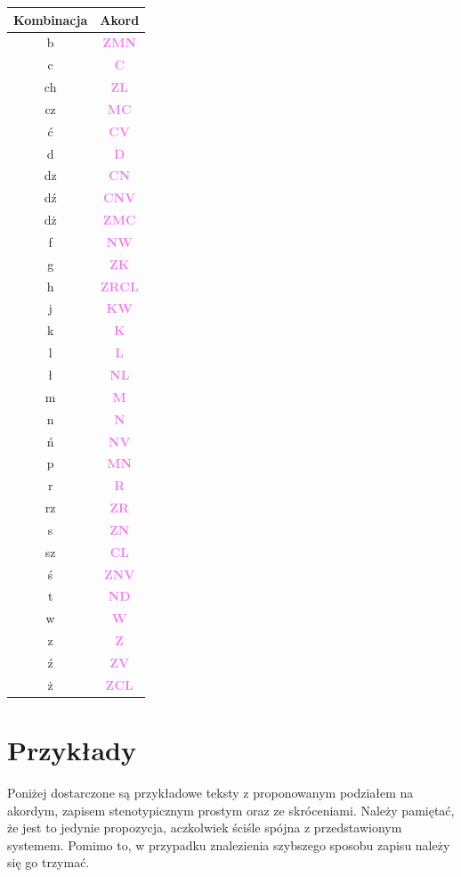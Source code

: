 \documentclass[12p, oneside]{book}
\newcommand{\steno}[1]{\textbf{\textsf{\textcolor{violet}{ #1}}}}
\begin{document}
\begin{longtable}{|c|c|}
	\hline \hline
	Kombinacja & Akord \\ \hline
	\endhead
	b & \steno{ZMN} \\ \hline
	c & \steno{C} \\ \hline
	ch & \steno{ZL} \\ \hline
	cz & \steno{MC} \\ \hline
	ć & \steno{CV} \\ \hline
	d & \steno{D} \\ \hline
	dz & \steno{CN} \\ \hline
	dź & \steno{CNV} \\ \hline
	dż & \steno{ZMC} \\ \hline
	f & \steno{NW} \\ \hline
	g & \steno{ZK} \\ \hline
	h & \steno{ZRCL} \\ \hline
	j & \steno{KW} \\ \hline
	k & \steno{K} \\ \hline
	l & \steno{L} \\ \hline
	ł & \steno{NL} \\ \hline
	m & \steno{M} \\ \hline
	n & \steno{N} \\ \hline
	ń & \steno{NV} \\ \hline
	p & \steno{MN} \\ \hline
	r & \steno{R} \\ \hline
	rz & \steno{ZR} \\ \hline
	s & \steno{ZN} \\ \hline
	sz & \steno{CL} \\ \hline
	ś & \steno{ZNV} \\ \hline
	t & \steno{ND} \\ \hline
	w & \steno{W} \\ \hline
	z & \steno{Z} \\ \hline
	ź & \steno{ZV} \\ \hline
	ż & \steno{ZCL} \\ \hline
\end{longtable}

\chapter{Przykłady}
Poniżej dostarczone są przykładowe teksty z proponowanym podziałem na akordym,
zapisem stenotypicznym prostym oraz ze skróceniami. Należy pamiętać, że jest to
jedynie propozycja, aczkolwiek ściśle spójna z przedstawionym systemem. Pomimo
to, w przypadku znalezienia szybszego sposobu zapisu należy się go trzymać.
\end{document}
